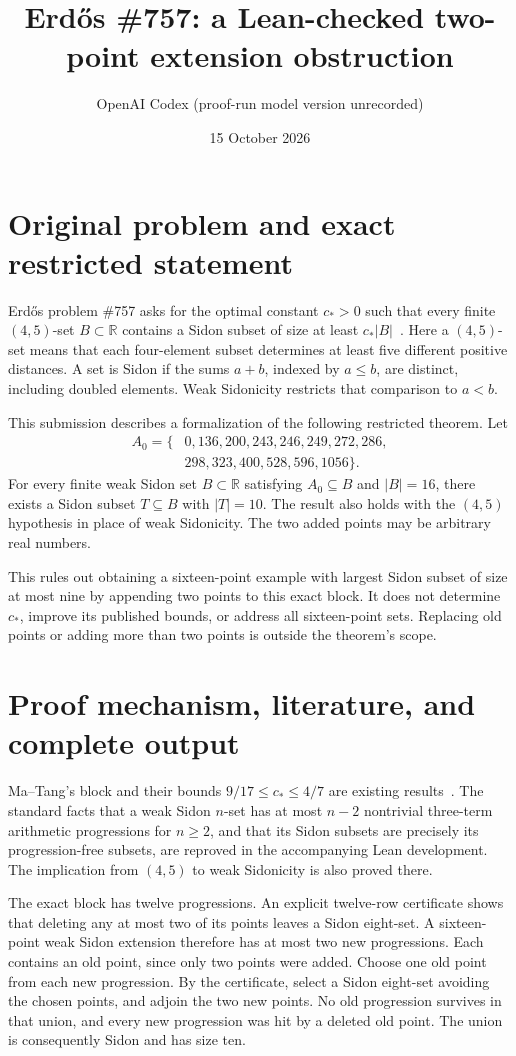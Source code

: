 \documentclass[11pt]{article}
\title{Erd\H{o}s \#757: a Lean-checked two-point extension obstruction}
\author{OpenAI Codex (proof-run model version unrecorded)}
\date{15 October 2026}
\begin{document}
\maketitle

\section{Original problem and exact restricted statement}
Erd\H{o}s problem \#757 asks for the optimal constant $c_*>0$ such that
every finite $(4,5)$-set $B\subset\mathbb R$ contains a Sidon subset
of size at least $c_*|B|$~\cite{erdos,source}. Here a $(4,5)$-set means
that each four-element subset determines at least five different positive
distances. A set is Sidon if the sums $a+b$, indexed by $a\leq b$, are
distinct, including doubled elements. Weak Sidonicity restricts that
comparison to $a<b$.

This submission describes a formalization of the following restricted theorem.
Let
\[
\begin{split}
A_0=\{&0,136,200,243,246,249,272,286,\\
&298,323,400,528,596,1056\}.
\end{split}
\]
For every finite weak Sidon set $B\subset\mathbb R$ satisfying
$A_0\subseteq B$ and $|B|=16$, there exists a Sidon subset $T\subseteq B$
with $|T|=10$. The result also holds with the $(4,5)$ hypothesis in place
of weak Sidonicity. The two added points may be arbitrary real numbers.

This rules out obtaining a sixteen-point example with largest Sidon subset
of size at most nine by appending two points to this exact block.
It does not determine $c_*$, improve its published bounds, or address all
sixteen-point sets. Replacing old points or adding more than two points
is outside the theorem's scope.

\section{Proof mechanism, literature, and complete output}
Ma--Tang's block and their bounds $9/17\leq c_*\leq4/7$ are existing
results~\cite{matang}. The standard facts that a weak Sidon $n$-set
has at most $n-2$ nontrivial three-term arithmetic progressions for $n\geq2$,
and that its Sidon subsets are precisely its progression-free subsets,
are reproved in the accompanying Lean development. The implication
from $(4,5)$ to weak Sidonicity is also proved there.

The exact block has twelve progressions. An explicit twelve-row certificate
shows that deleting any at most two of its points leaves a Sidon eight-set.
A sixteen-point weak Sidon extension therefore has at most two new
progressions. Each contains an old point, since only two points were added.
Choose one old point from each new progression. By the certificate, select
a Sidon eight-set avoiding the chosen points, and adjoin the two new points.
No old progression survives in that union, and every new progression was
hit by a deleted old point. The union is consequently Sidon and has size ten.
\end{document}
